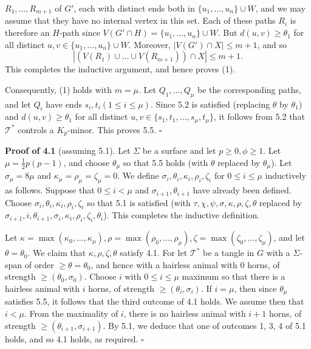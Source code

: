 \noindent $R_1, \dots, R_{m+1}$ of $G'$, each with distinct ends both in $\{u_1, \dots, u_n\} \cup W$, and we may assume that they have no internal vertex in this set. Each of these paths $R_i$ is therefore an $H$-path since $V(G' \cap H) = \{u_1, \dots, u_n\} \cup W$. But $d(u, v) \ge \theta_1$ for all distinct $u, v \in \{u_1, \dots, u_n\} \cup W$. Moreover, $|V(G') \cap X| \le m + 1$, and so
\begin{equation*}
|(V(R_1) \cup \dots \cup V(R_{m+1})) \cap X| \le m + 1.
\end{equation*}
This completes the inductive argument, and hence proves (1).

Consequently, (1) holds with $m = \mu$. Let $Q_1, \dots, Q_\mu$ be the corresponding paths, and let $Q_i$ have ends $s_i, t_i (1 \le i \le \mu)$. Since 5.2 is satisfied (replacing $\theta$ by $\theta_1$) and $d(u, v) \ge \theta_1$ for all distinct $u, v \in \{s_1, t_1, \dots, s_\mu, t_\mu\}$, it follows from 5.2 that $\mathscr{T}^*$ controls a $K_p$-minor. This proves 5.5. $\square$

\textbf{Proof of 4.1} (assuming 5.1). Let $\Sigma$ be a surface and let $p \ge 0, \phi \ge 1$. Let $\mu = \frac{1}{2}p(p - 1)$, and choose $\theta_\mu$ so that 5.5 holds (with $\theta$ replaced by $\theta_\mu$). Let $\sigma_\mu = 8\mu$ and $\kappa_\mu = \rho_\mu = \zeta_\mu = 0$. We define $\sigma_i, \theta_i, \kappa_i, \rho_i, \zeta_i$ for $0 \le i \le \mu$ inductively as follows. Suppose that $0 \le i < \mu$ and $\sigma_{i+1}, \theta_{i+1}$ have already been defined. Choose $\sigma_i, \theta_i, \kappa_i, \rho_i, \zeta_i$ so that 5.1 is satisfied (with $\tau, \chi, \psi, \sigma, \kappa, \rho, \zeta, \theta$ replaced by $\sigma_{i+1}, i, \theta_{i+1}, \sigma_i, \kappa_i, \rho_i, \zeta_i, \theta_i$). This completes the inductive definition.

Let $\kappa = \max(\kappa_0, \dots, \kappa_\mu), \rho = \max(\rho_0, \dots, \rho_\mu), \zeta = \max(\zeta_0, \dots, \zeta_\mu)$, and let $\theta = \theta_0$. We claim that $\kappa, \rho, \zeta, \theta$ satisfy 4.1. For let $\mathscr{T}^*$ be a tangle in $G$ with a $\Sigma$-span of order $\ge \theta = \theta_0$, and hence with a hairless animal with $0$ horns, of strength $\ge (\theta_0, \sigma_0)$. Choose $i$ with $0 \le i \le \mu$ maximum so that there is a hairless animal with $i$ horns, of strength $\ge (\theta_i, \sigma_i)$. If $i = \mu$, then since $\theta_\mu$ satisfies 5.5, it follows that the third outcome of 4.1 holds. We assume then that $i < \mu$. From the maximality of $i$, there is no hairless animal with $i + 1$ horns, of strength $\ge (\theta_{i+1}, \sigma_{i+1})$. By 5.1, we deduce that one of outcomes 1, 3, 4 of 5.1 holds, and so 4.1 holds, as required. $\square$

